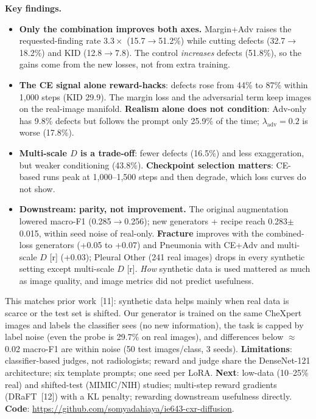 \documentclass[10pt]{article}
\newcommand{\sect}[1]{\vspace{2pt}{\large\bf #1}\par}
\begin{document}
\vspace{4pt}
\textbf{Key findings.}
\begin{itemize}
\item \textbf{Only the combination improves both axes.} Margin+Adv raises the requested-finding rate $3.3\times$ (15.7$\to$51.2\%) while cutting defects (32.7$\to$18.2\%) and KID (12.8$\to$7.8). The control \emph{increases} defects (51.8\%), so the gains come from the new losses, not from extra training.
\item \textbf{The CE signal alone reward-hacks}: defects rose from 44\% to 87\% within 1{,}000 steps (KID 29.9). The margin loss and the adversarial term keep images on the real-image manifold. \textbf{Realism alone does not condition}: Adv-only has 9.8\% defects but follows the prompt only 25.9\% of the time; $\lambda_{\text{adv}}=0.2$ is worse (17.8\%).
\item \textbf{Multi-scale $D$ is a trade-off}: fewer defects (16.5\%) and less exaggeration, but weaker conditioning (43.8\%). \textbf{Checkpoint selection matters}: CE-based runs peak at 1{,}000--1{,}500 steps and then degrade, which loss curves do not show.
\item \textbf{Downstream: parity, not improvement.} The original augmentation lowered macro-F1 (0.285$\to$0.256); new generators + recipe reach 0.283$\pm$0.015, within seed noise of real-only. \textbf{Fracture} improves with the combined-loss generators (+0.05 to +0.07) and Pneumonia with CE+Adv and multi-scale $D$ [r] (+0.03); Pleural Other (241 real images) drops in every synthetic setting except multi-scale $D$ [r]. \emph{How} synthetic data is used mattered as much as image quality, and image metrics did not predict usefulness.
\end{itemize}

\sect{4\quad Why no overall gain, and next steps}
This matches prior work~[11]: synthetic data helps mainly when real data is scarce or the test set is shifted. Our generator is trained on the same CheXpert images and labels the classifier sees (no new information), the task is capped by label noise (even the probe is 29.7\% on real images), and differences below $\approx$0.02 macro-F1 are within noise (50 test images/class, 3 seeds). \textbf{Limitations}: classifier-based judges, not radiologists; reward and judge share the DenseNet-121 architecture; six template prompts; one seed per LoRA. \textbf{Next}: low-data (10--25\% real) and shifted-test (MIMIC/NIH) studies; multi-step reward gradients (DRaFT~[12]) with a KL penalty; rewarding downstream usefulness directly. \textbf{Code}: \url{https://github.com/somyadahiaya/ie643-cxr-diffusion}.
\end{document}
